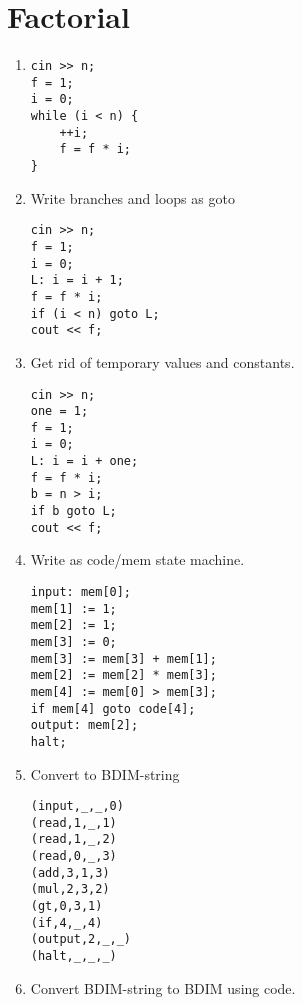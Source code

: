\documentclass{scrartcl}
\begin{document}
\section{Factorial}
\begin{enumerate}
\item \begin{verbatim}
cin >> n;
f = 1;
i = 0;
while (i < n) {
	++i;
	f = f * i;
}
\end{verbatim}

\item Write branches and loops as goto
\begin{verbatim}
cin >> n;
f = 1;
i = 0;
L: i = i + 1;
f = f * i;
if (i < n) goto L;
cout << f;
\end{verbatim}

\item Get rid of temporary values and constants.

\begin{verbatim}
cin >> n;
one = 1;
f = 1;
i = 0;
L: i = i + one;
f = f * i;
b = n > i;
if b goto L;
cout << f;
\end{verbatim}


\item Write as code/mem state machine.
\begin{verbatim}
input: mem[0];
mem[1] := 1;
mem[2] := 1;
mem[3] := 0;
mem[3] := mem[3] + mem[1];
mem[2] := mem[2] * mem[3];
mem[4] := mem[0] > mem[3];
if mem[4] goto code[4];
output: mem[2];
halt;
\end{verbatim}

\item Convert to BDIM-string
\begin{verbatim}
(input,_,_,0)
(read,1,_,1)
(read,1,_,2)
(read,0,_,3)
(add,3,1,3)
(mul,2,3,2)
(gt,0,3,1)
(if,4,_,4)
(output,2,_,_)
(halt,_,_,_)
\end{verbatim}

\item Convert BDIM-string to BDIM using code.
	\inputminted[linenos,firstnumber=0]{text}{bdim/fact.bdim}
\end{enumerate}
\end{document}
